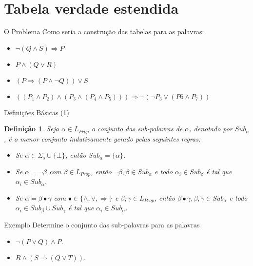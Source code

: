 \documentclass[aspectratio=169]{beamer}
\newtheorem{defi}{Definição}
\begin{document}
	\section{Tabela verdade estendida}
	
	\begin{frame}{O Problema}
		Como seria a construção das tabelas para as palavras:
		\begin{itemize}
			\item $\neg(Q \land S) \Rightarrow P$
			\item $P \land (Q \lor R)$
			\item $(P \Rightarrow (P \land \neg Q)) \lor S$
			\item $((P_1 \land P_2) \land (P_3 \land (P_4 \land P_5))) \Rightarrow \neg (\neg P_3 \lor (P6 \land P_7))$
		\end{itemize}
	\end{frame}

	\begin{frame}{Definições Básicas (1)}
		\begin{defi}
			Seja $\alpha \in L_{Prop}$ o conjunto das sub-palavras de $\alpha$, denotado por $Sub_{\alpha}$, é o menor conjunto indutivamente gerado pelas seguintes regras:
			\begin{itemize}
				\item[R1.] Se $\alpha \in \Sigma_s \cup \{\bot\}$, então $Sub_\alpha = \{\alpha\}$.
				\item[R2.] Se $\alpha = \neg \beta$ com $\beta \in L_{Prop}$, então $\neg \beta, \beta \in Sub_\alpha$ e todo $\alpha_i \in Sub_\beta$ é tal que $\alpha_i \in Sub_\alpha$.
				\item[R3.] Se $\alpha = \beta \bullet \gamma$  com $\bullet \in \{\land, \lor, \Rightarrow\}$ e $\beta, \gamma \in L_{Prop}$, então $\beta \bullet \gamma, \beta, \gamma \in Sub_\alpha$ e todo $\alpha_i \in Sub_\beta \cup Sub_\gamma$ é tal que $\alpha_i \in Sub_\alpha$.
			\end{itemize}
		\end{defi}
	\end{frame}

	\begin{frame}{Exemplo}
		Determine o conjunto das sub-palavras para as palavras
		\begin{itemize}
			\item $\neg(P \lor Q) \land P$.
			\item $R \land (S \Rightarrow (Q \lor T))$.
		\end{itemize}
	\end{frame}
\end{document}
